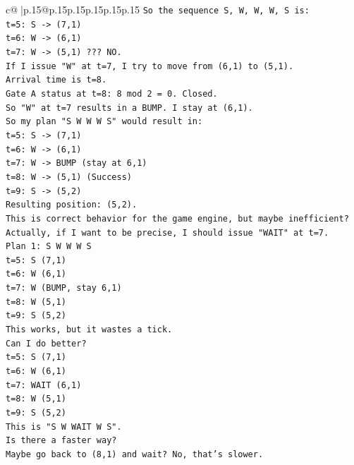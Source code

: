 \documentclass{article}
\begin{document}
{\begin{supertabular}{c@{$\;$}|p{.15\linewidth}@{}p{.15\linewidth}p{.15\linewidth}p{.15\linewidth}p{.15\linewidth}p{.15\linewidth}}
{{{\texttt{So the sequence S, W, W, W, S is:} \\
\texttt{t=5: S {-}> (7,1)} \\
\texttt{t=6: W {-}> (6,1)} \\
\texttt{t=7: W {-}> (5,1) ??? NO.} \\
\texttt{If I issue "W" at t=7, I try to move from (6,1) to (5,1).} \\
\texttt{Arrival time is t=8.} \\
\texttt{Gate A status at t=8: 8 mod 2 = 0. Closed.} \\
\texttt{So "W" at t=7 results in a BUMP. I stay at (6,1).} \\
\texttt{So my plan "S W W W S" would result in:} \\
\texttt{t=5: S {-}> (7,1)} \\
\texttt{t=6: W {-}> (6,1)} \\
\texttt{t=7: W {-}> BUMP (stay at 6,1)} \\
\texttt{t=8: W {-}> (5,1) (Success)} \\
\texttt{t=9: S {-}> (5,2)} \\
\texttt{Resulting position: (5,2).} \\
\texttt{This is correct behavior for the game engine, but maybe inefficient?} \\
\texttt{Actually, if I want to be precise, I should issue "WAIT" at t=7.} \\
\texttt{Plan 1: S W W W S} \\
\texttt{t=5: S (7,1)} \\
\texttt{t=6: W (6,1)} \\
\texttt{t=7: W (BUMP, stay 6,1)} \\
\texttt{t=8: W (5,1)} \\
\texttt{t=9: S (5,2)} \\
\texttt{This works, but it wastes a tick.} \\
\texttt{Can I do better?} \\
\texttt{t=5: S (7,1)} \\
\texttt{t=6: W (6,1)} \\
\texttt{t=7: WAIT (6,1)} \\
\texttt{t=8: W (5,1)} \\
\texttt{t=9: S (5,2)} \\
\texttt{This is "S W WAIT W S".} \\
\texttt{Is there a faster way?} \\
\texttt{Maybe go back to (8,1) and wait? No, that's slower.} \\
}}}
\end{supertabular}}
\end{document}

